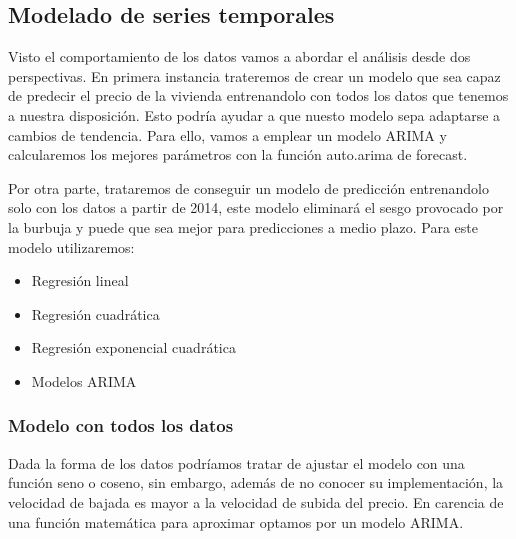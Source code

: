 \documentclass[
]{article}
\newenvironment{Shaded}{\begin{snugshade}}{\end{snugshade}}
\newcommand{\AttributeTok}[1]{\textcolor[rgb]{0.77,0.63,0.00}{#1}}
\newcommand{\DecValTok}[1]{\textcolor[rgb]{0.00,0.00,0.81}{#1}}
\newcommand{\FunctionTok}[1]{\textcolor[rgb]{0.00,0.00,0.00}{#1}}
\newcommand{\NormalTok}[1]{#1}
\newcommand{\OtherTok}[1]{\textcolor[rgb]{0.56,0.35,0.01}{#1}}
\newcommand{\SpecialCharTok}[1]{\textcolor[rgb]{0.00,0.00,0.00}{#1}}
\begin{document}
\hypertarget{modelado-de-series-temporales}{%
\subsection{Modelado de series
temporales}\label{modelado-de-series-temporales}}

Visto el comportamiento de los datos vamos a abordar el análisis desde
dos perspectivas. En primera instancia trateremos de crear un modelo que
sea capaz de predecir el precio de la vivienda entrenandolo con todos
los datos que tenemos a nuestra disposición. Esto podría ayudar a que
nuesto modelo sepa adaptarse a cambios de tendencia. Para ello, vamos a
emplear un modelo ARIMA y calcularemos los mejores parámetros con la
función auto.arima de forecast.

Por otra parte, trataremos de conseguir un modelo de predicción
entrenandolo solo con los datos a partir de 2014, este modelo eliminará
el sesgo provocado por la burbuja y puede que sea mejor para
predicciones a medio plazo. Para este modelo utilizaremos:

\begin{itemize}
\item
  Regresión lineal
\item
  Regresión cuadrática
\item
  Regresión exponencial cuadrática
\item
  Modelos ARIMA
\end{itemize}

\hypertarget{modelo-con-todos-los-datos}{%
\subsubsection{Modelo con todos los
datos}\label{modelo-con-todos-los-datos}}

Dada la forma de los datos podríamos tratar de ajustar el modelo con una
función seno o coseno, sin embargo, además de no conocer su
implementación, la velocidad de bajada es mayor a la velocidad de subida
del precio. En carencia de una función matemática para aproximar optamos
por un modelo ARIMA.

\begin{Shaded}
\end{Shaded}
\end{document}
